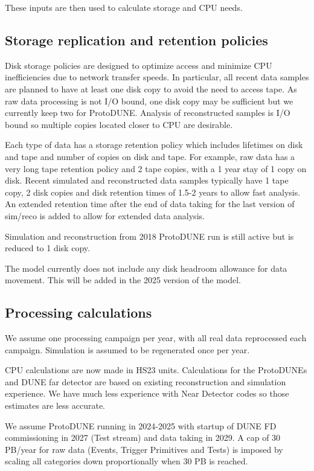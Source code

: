\documentclass[12pt]{article}
\begin{document}
     

  These inputs are then used to calculate storage and CPU needs. 

\subsection{Storage replication and retention policies}
Disk storage policies are designed to optimize access and minimize CPU inefficiencies due to network transfer speeds.  In particular, all recent data samples are planned to have at least one disk copy to avoid the need to access tape.  As raw data processing is not I/O bound, one disk copy may be sufficient but we currently keep two for ProtoDUNE. Analysis of reconstructed samples is I/O bound so multiple copies located closer to CPU are desirable. 

Each type of data has a storage retention policy which includes lifetimes on disk and tape and number of copies on disk and tape.  For example, raw data has a very long tape retention policy and 2 tape copies, with a 1 year stay of 1 copy on disk.   Recent simulated and reconstructed data samples typically have 1 tape copy, 2 disk copies and disk retention times of 1.5-2 years to allow fast analysis.   An extended retention time after the end of data taking for the last version of sim/reco is added to allow for extended data analysis. 

Simulation and reconstruction from 2018 ProtoDUNE run is still active but is reduced to 1 disk copy. 

The model currently does not include any disk headroom allowance for data movement.  This will be added in the 2025 version of the model. 

\subsection{Processing calculations}

 We assume one processing campaign per year, with all real data reprocessed each campaign.   Simulation is assumed to be regenerated  once per year.
   
CPU calculations are now made in HS23 units.  Calculations for the ProtoDUNEs and DUNE far detector are based on existing reconstruction and simulation experience.  We have much less experience with Near Detector codes so those estimates are less accurate.

We assume ProtoDUNE running in 2024-2025 with startup of DUNE FD commissioning in 2027 (Test stream) and data taking in 2029. A cap of 30 PB/year for raw data (Events, Trigger Primitives and Tests) is imposed by scaling all categories down proportionally when 30 PB is reached. 
\end{document}
